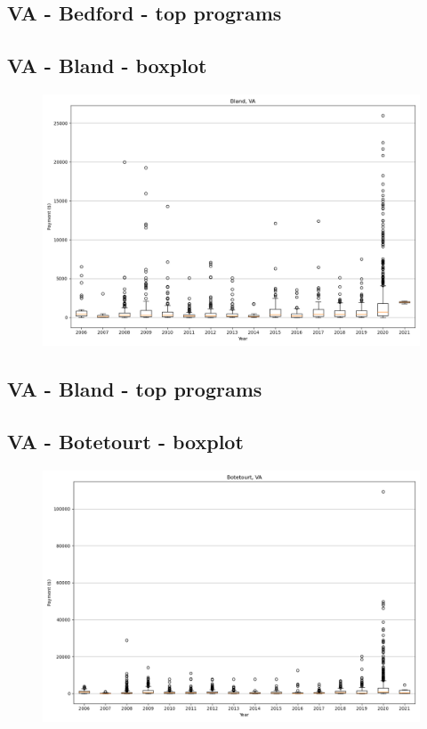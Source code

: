 \subsection*{VA - Bedford - top programs}

\newpage
\subsection*{VA - Bland - boxplot}
\begin{figure}[h]
\centering
\includegraphics[width=7in]{../output/boxplots/counties/Bland-VA_boxplot.png}
\end{figure}


\subsection*{VA - Bland - top programs}

\newpage
\subsection*{VA - Botetourt - boxplot}
\begin{figure}[h]
\centering
\includegraphics[width=7in]{../output/boxplots/counties/Botetourt-VA_boxplot.png}
\end{figure}



